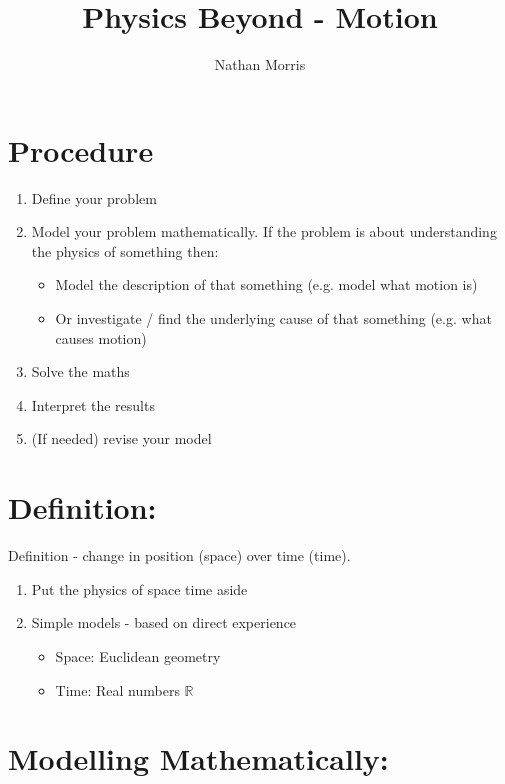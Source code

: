 \documentclass[a4paper, 12pt]{article}
\begin{document}
\title{Physics Beyond - Motion}
\author{Nathan Morris}
\maketitle

\newpage

\tableofcontents
{}


\newpage

\section{Procedure}
\begin{enumerate}
\item Define your problem
\item Model your problem mathematically. If the problem is about understanding the physics of something then:
\begin{itemize}
\item Model the description of that something (e.g. model what motion is)
\item Or investigate / find the underlying cause of that something (e.g. what causes motion)
\end{itemize}
\item Solve the maths
\item Interpret the results
\item (If needed) revise your model
\end{enumerate}

\newpage

\section{Definition:}
Definition - change in position (space) over time (time).
\begin{enumerate}
\item Put the physics of space time aside
\item Simple models - based on direct experience
\begin{itemize}
\item Space: Euclidean geometry
\item Time: Real numbers   
$\mathbb{R}$
\end{itemize}
\end{enumerate}

\section{Modelling Mathematically:}
\end{document}

